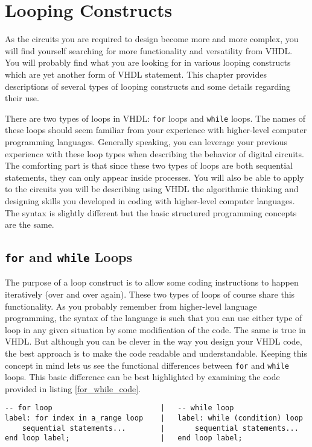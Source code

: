 %
%
%
\chapter{Looping Constructs}
As the circuits you are required to design become more and more complex, you will find yourself searching for more functionality and versatility from VHDL. You will probably find what you are looking for in various looping constructs which are yet another form of VHDL statement. This chapter provides descriptions of several types of looping constructs and some details regarding their use. 

There are two types of loops in VHDL: \texttt{for} loops and \texttt{while} loops. The names of these loops should seem familiar from your experience with higher-level computer programming languages. Generally speaking, you can leverage your previous experience with these loop types when describing the behavior of digital circuits. The comforting part is that since these two types of loops are both sequential statements, they can only appear inside processes. You will also be able to apply to the circuits you will be describing using VHDL the algorithmic thinking and designing skills you developed in coding with higher-level computer languages. The syntax is slightly different but the basic structured programming concepts are the same. 

\section{\texttt{for} and \texttt{while} Loops}
The purpose of a loop construct is to allow some coding instructions to happen iteratively (over and over again). These two types of loops of course share this functionality. As you probably remember from higher-level language programming, the syntax of the language is such that you can use either type of loop in any given situation by some modification of the code. The same is true in VHDL. But although you can be clever in the way you design your VHDL code, the best approach is to make the code readable and understandable. Keeping this concept in mind lets us see the functional differences between \texttt{for} and \texttt{while} loops. This basic difference can be best highlighted by examining the code provided in listing \ref{for_while_code}.

\noindent
\begin{minipage}{0.99\linewidth}
\begin{lstlisting}[label=for_while_code, caption=The basic structure of the \texttt{for} and \texttt{while} loops.]
-- for loop							|	-- while loop
label: for index in a_range loop	|	label: while (condition) loop
	sequential statements...		|		sequential statements...
end loop label;						|	end loop label;
\end{lstlisting}
\end{minipage}

